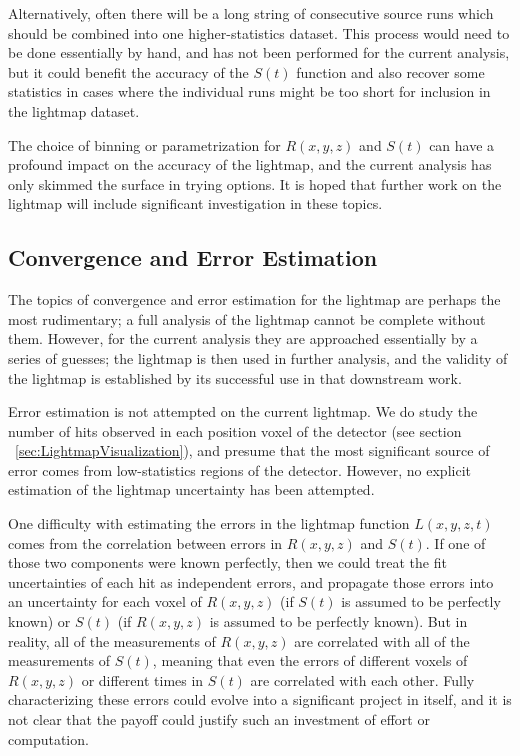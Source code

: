 Alternatively, often there will be a long string of consecutive source runs which should be combined into one higher-statistics dataset.  This process would need to be done essentially by hand, and has not been performed for the current analysis, but it could benefit the accuracy of the $S(t)$ function and also recover some statistics in cases where the individual runs might be too short for inclusion in the lightmap dataset.

The choice of binning or parametrization for $R(x,y,z)$ and $S(t)$ can have a profound impact on the accuracy of the lightmap, and the current analysis has only skimmed the surface in trying options.  It is hoped that further work on the lightmap will include significant investigation in these topics.

\subsection{Convergence and Error Estimation}

The topics of convergence and error estimation for the lightmap are perhaps the most rudimentary; a full analysis of the lightmap cannot be complete without them.  However, for the current analysis they are approached essentially by a series of guesses; the lightmap is then used in further analysis, and the validity of the lightmap is established by its successful use in that downstream work.

Error estimation is not attempted on the current lightmap.  We do study the number of hits observed in each position voxel of the detector (see section ~\ref{sec:LightmapVisualization}), and presume that the most significant source of error comes from low-statistics regions of the detector.  However, no explicit estimation of the lightmap uncertainty has been attempted.

One difficulty with estimating the errors in the lightmap function $L(x,y,z,t)$ comes from the correlation between errors in $R(x,y,z)$ and $S(t)$.  If one of those two components were known perfectly, then we could treat the fit uncertainties of each hit as independent errors, and propagate those errors into an uncertainty for each voxel of $R(x,y,z)$ (if $S(t)$ is assumed to be perfectly known) or $S(t)$ (if $R(x,y,z)$ is assumed to be perfectly known).  But in reality, all of the measurements of $R(x,y,z)$ are correlated with all of the measurements of $S(t)$, meaning that even the errors of different voxels of $R(x,y,z)$ or different times in $S(t)$ are correlated with each other.  Fully characterizing these errors could evolve into a significant project in itself, and it is not clear that the payoff could justify such an investment of effort or computation.

